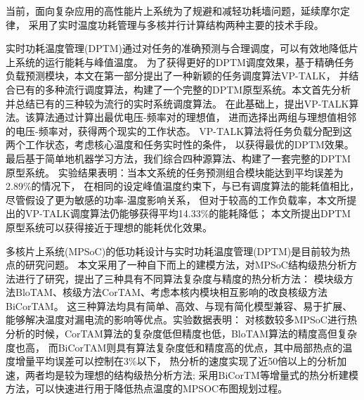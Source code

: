 

{}

\makeatother



\begin{cabstract}

当前，面向复杂应用的高性能片上系统为了规避和减轻功耗墙问题，延续摩尔定律， 采用了实时温度功耗管理与多核并行计算结构两种主要的技术手段。


实时功耗温度管理(DPTM)通过对任务的准确预测与合理调度，可以有效地降低片上系统的运行能耗与峰值温度。 为了获得更好的DPTM调度效果，基于精确任务负载预测模块，本文在第一部分提出了一种新颖的任务调度算法VP-TALK， 并结合已有的多种流行调度算法，构建了一个完整的DPTM原型系统。本文首先分析并总结已有的三种较为流行的实时系统调度算法。 在此基础上，提出VP-TALK算法。该算法通过计算出最优电压-频率对的理想值， 进而选择出两组与理想值相邻的电压-频率对，获得两个现实的工作状态。 VP-TALK算法将任务负载分配到这两个工作状态，考虑核心温度和任务实时性的条件， 以获得最优的DPTM效果。最后基于简单地机器学习方法，我们综合四种源算法、构建了一套完整的DPTM原型系统。 实验结果表明：当本文系统的任务预测组合模块能达到平均误差为2.89\%的情况下，
在相同的设定峰值温度约束下，与已有调度算法的能耗值相比，尽管假设了更为敏感的功率-温度影响关系， 但对于较高的工作负载率，本文所提出的VP-TALK调度算法仍能够获得平均14.33\%的能耗降低；
本文所提出DPTM原型系统可以获得接近于理想的能耗优化效果。


多核片上系统(MPSoC)的低功耗设计与实时功耗温度管理(DPTM)是目前较为热点的研究问题。 本文采用了一种自下而上的建模方法，对MPSoC结构级热分析方法进行了研究，提出了三种具有不同算法复杂度与精度的热分析方法： 模块级方法BloTAM、核级方法CorTAM、考虑本核内模块相互影响的改良核级方法BiCorTAM。 这三种算法均具有简单、高效、与现有简化模型兼容、易于扩展、能够解决温度对漏电流的影响等优点。实验数据表明：
对核数较多MPSoC进行热分析的时候，CorTAM算法的复杂度低但精度也低，BloTAM算法的精度高但复杂度也高， 而BiCorTAM则具有算法复杂度低和精度高的优点，其中局部热点的温度增量平均误差可以控制在3\%以下， 热分析的速度实现了近50倍以上的分析加速，两者均是较为理想的结构级热分析方法;
采用BiCorTM等增量式的热分析建模方法，可以快速进行用于降低热点温度的MPSOC布图规划过程。


\end{cabstract}

